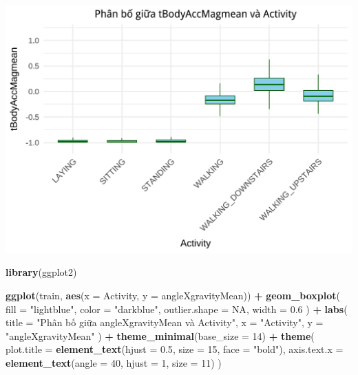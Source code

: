 \documentclass[
]{article}
\newenvironment{Shaded}{\begin{snugshade}}{\end{snugshade}}
\newcommand{\AttributeTok}[1]{\textcolor[rgb]{0.13,0.29,0.53}{#1}}
\newcommand{\ConstantTok}[1]{\textcolor[rgb]{0.56,0.35,0.01}{#1}}
\newcommand{\DecValTok}[1]{\textcolor[rgb]{0.00,0.00,0.81}{#1}}
\newcommand{\FloatTok}[1]{\textcolor[rgb]{0.00,0.00,0.81}{#1}}
\newcommand{\FunctionTok}[1]{\textcolor[rgb]{0.13,0.29,0.53}{\textbf{#1}}}
\newcommand{\NormalTok}[1]{#1}
\newcommand{\SpecialCharTok}[1]{\textcolor[rgb]{0.81,0.36,0.00}{\textbf{#1}}}
\newcommand{\StringTok}[1]{\textcolor[rgb]{0.31,0.60,0.02}{#1}}
\begin{document}
\includegraphics{report_files/figure-latex/unnamed-chunk-19-1.pdf}

\begin{Shaded}
\begin{Highlighting}[]
\FunctionTok{library}\NormalTok{(ggplot2)}

\FunctionTok{ggplot}\NormalTok{(train, }\FunctionTok{aes}\NormalTok{(}\AttributeTok{x =}\NormalTok{ Activity, }\AttributeTok{y =}\NormalTok{ angleXgravityMean)) }\SpecialCharTok{+}
  \FunctionTok{geom\_boxplot}\NormalTok{(}
    \AttributeTok{fill =} \StringTok{"lightblue"}\NormalTok{,}
    \AttributeTok{color =} \StringTok{"darkblue"}\NormalTok{,}
    \AttributeTok{outlier.shape =} \ConstantTok{NA}\NormalTok{,}
    \AttributeTok{width =} \FloatTok{0.6}
\NormalTok{  ) }\SpecialCharTok{+}
  \FunctionTok{labs}\NormalTok{(}
    \AttributeTok{title =} \StringTok{"Phân bố giữa angleXgravityMean và Activity"}\NormalTok{,}
    \AttributeTok{x =} \StringTok{"Activity"}\NormalTok{,}
    \AttributeTok{y =} \StringTok{"angleXgravityMean"}
\NormalTok{  ) }\SpecialCharTok{+}
  \FunctionTok{theme\_minimal}\NormalTok{(}\AttributeTok{base\_size =} \DecValTok{14}\NormalTok{) }\SpecialCharTok{+}
  \FunctionTok{theme}\NormalTok{(}
    \AttributeTok{plot.title =} \FunctionTok{element\_text}\NormalTok{(}\AttributeTok{hjust =} \FloatTok{0.5}\NormalTok{, }\AttributeTok{size =} \DecValTok{15}\NormalTok{, }\AttributeTok{face =} \StringTok{"bold"}\NormalTok{),}
    \AttributeTok{axis.text.x =} \FunctionTok{element\_text}\NormalTok{(}\AttributeTok{angle =} \DecValTok{40}\NormalTok{, }\AttributeTok{hjust =} \DecValTok{1}\NormalTok{, }\AttributeTok{size =} \DecValTok{11}\NormalTok{)}
\NormalTok{  )}
\end{Highlighting}
\end{Shaded}
\end{document}
